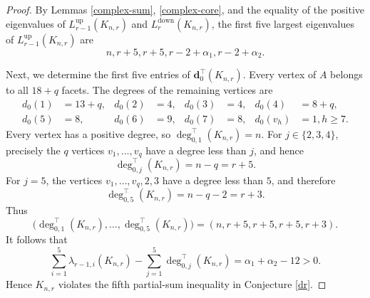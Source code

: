 \documentclass[12pt]{amsart}
\theoremstyle{plain}
\theoremstyle{definition}
\numberwithin{equation}{section}
\numberwithin{figure}{section}
\newcommand{\dd}{\mathbf d}
\newcommand{\Ldown}{L^{\operatorname{down}}}
\newcommand{\Lup}{L^{\operatorname{up}}}
\begin{document}
\begin{proof}
By Lemmas \ref{complex-sum}, \ref{complex-core}, and the equality of the positive eigenvalues of $\Lup_{r-1}(K_{n,r})$ and $\Ldown_r(K_{n,r})$, the first five largest eigenvalues of $\Lup_{r-1}(K_{n,r})$ are
$$n, r + 5, r + 5, r - 2 + \alpha_1,
r - 2 + \alpha_2.$$


 Next, we determine the first five entries of $\dd_0^\top(K_{n,r})$.
Every vertex of $A$ belongs to all $18+q$ facets.
The degrees of the remaining vertices are
\[
\begin{aligned}
d_0(1)&=13+q,&
d_0(2)&=4,&
d_0(3)&=4,&
d_0(4)&=8+q,\\
d_0(5)&=8,&
d_0(6)&=9,&
d_0(7)&=8,&
d_0(v_h)&=1, h \ge 7.
\end{aligned}
\]
Every vertex has a positive degree, so $\deg^\top_{0,1}(K_{n,r})=n$.
For $j\in\{2,3,4\}$, precisely the $q$ vertices $v_1,\ldots,v_q$ have a degree less than $j$, and hence
\[
\deg^\top_{0,j}(K_{n,r})=n-q=r+5.
\]
For $j=5$, the vertices $v_1,\ldots,v_q,2,3$ have a degree less than $5$, and therefore
\[
\deg^\top_{0,5}(K_{n,r})=n-q-2=r+3.
\]
Thus
\[
\bigl(\deg^\top_{0,1}(K_{n,r}),\ldots,\deg^\top_{0,5}(K_{n,r})\bigr)
=
(n,r+5,r+5,r+5,r+3).
\]
It follows that
\[
\sum_{i=1}^{5}\lambda_{r-1,i}(K_{n,r})
-
\sum_{j=1}^{5}\deg^\top_{0,j}(K_{n,r})
=
\alpha_1+\alpha_2-12
>
0.
\]
Hence $K_{n,r}$ violates the fifth partial-sum inequality in Conjecture \ref{dr}.
\end{proof}
\end{document}

